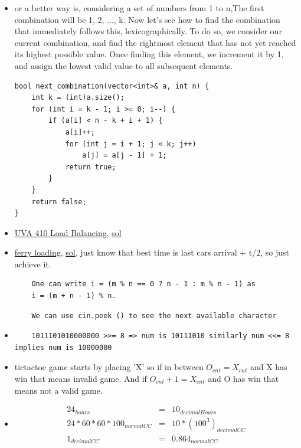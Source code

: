 \documentclass[8pt, a4paper, oneside, twocolumn]{extarticle}
\begin{document}
\begin{itemize}
    \item or a better way is, considering a set of numbers from 1 to n,The first combination will be 1, 2, ..., k. Now let's see how to find the combination that immediately follows this, lexicographically. To do so, we consider our current combination, and find the rightmost element that has not yet reached its highest possible value. Once finding this element, we increment it by 1, and assign the lowest valid value to all subsequent elements.
\begin{verbatim}
bool next_combination(vector<int>& a, int n) {
    int k = (int)a.size();
    for (int i = k - 1; i >= 0; i--) {
        if (a[i] < n - k + i + 1) {
            a[i]++;
            for (int j = i + 1; j < k; j++)
                a[j] = a[j - 1] + 1;
            return true;
        }
    }
    return false;
}
\end{verbatim}
    \item \href{https://uva.onlinejudge.org/external/4/410.pdf}{UVA 410 Load Balancing}, \href{https://gist.github.com/sourabh2311/5405601b47b1bd9c8fa769c82b280328}{sol}
    \item \href{https://uva.onlinejudge.org/external/104/10440.pdf}{ferry loading}, \href{https://gist.github.com/sourabh2311/4af5bc294ab613057de828b308da587a}{sol}, just know that best time is last cars arrival + t/2, so just achieve it.
    \begin{verbatim}
    One can write i = (m % n == 0 ? n - 1 : m % n - 1) as
    i = (m + n - 1) % n.
    \end{verbatim}
    \begin{verbatim}
    We can use cin.peek () to see the next available character
    \end{verbatim}
    \item
    \begin{verbatim}
    1011101010000000 >>= 8 => num is 10111010 similarly num <<= 8 implies num is 10000000
    \end{verbatim}
    \item tictactoe game starts by placing 'X' so if in between $O_{cnt} = X_{cnt}$ and X has win that means invalid game. And if $O_{cnt} + 1 = X_{cnt}$ and O has win that means not a valid game.
    \item 
    \begin{eqnarray}
    24_{hours} & = & 10_{decimalHours} \\
    24 * 60 * 60 * 100_{normalCC} & = & 10 * (100^3)_{decimalCC} \\
    1_{decimalCC} & = & 0.864_{normalCC} 

\end{eqnarray}
\end{itemize}
\end{document}
